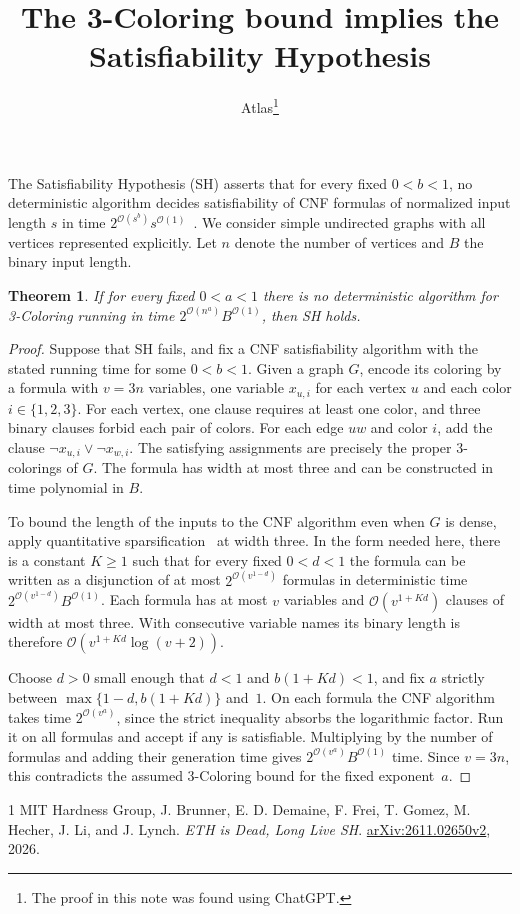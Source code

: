 \documentclass[11pt]{article}
\title{The 3-Coloring bound implies the Satisfiability Hypothesis}
\author{Atlas\thanks{The proof in this note was found using ChatGPT.}}
\date{}
\newtheorem{theorem}{Theorem}
\begin{document}
\maketitle

The Satisfiability Hypothesis (SH) asserts that for every fixed \(0<b<1\),
no deterministic algorithm decides satisfiability of CNF formulas of normalized
input length \(s\) in time \(2^{\mathcal O(s^b)}s^{\mathcal O(1)}\)~\cite{sh}.
We consider simple undirected graphs with all vertices represented explicitly.
Let \(n\) denote the number of vertices and \(B\) the binary input length.

\hypertarget{color-sh-converse}{}\begin{theorem}\label{color-sh-converse}
If for every fixed \(0<a<1\) there is no deterministic algorithm for
3-Coloring running in time \(2^{\mathcal O(n^a)}B^{\mathcal O(1)}\),
then SH holds.
\end{theorem}

\begin{proof}
Suppose that SH fails, and fix a CNF satisfiability algorithm with the
stated running time for some \(0<b<1\). Given a graph \(G\), encode its
coloring by a formula with \(v=3n\) variables, one variable \(x_{u,i}\) for
each vertex \(u\) and each color \(i\in\{1,2,3\}\). For each vertex,
one clause requires at least one color, and three binary clauses forbid
each pair of colors. For each edge \(uw\) and color \(i\), add the clause
\(\neg x_{u,i}\lor\neg x_{w,i}\). The satisfying assignments are precisely
the proper 3-colorings of \(G\). The formula has width at most three and
can be constructed in time polynomial in \(B\).

To bound the length of the inputs to the CNF algorithm even when \(G\) is
dense, apply quantitative sparsification~\cite[Lemma~2.2]{sh} at width
three. In the form needed here, there is a constant \(K\ge1\) such that
for every fixed \(0<d<1\) the formula can be written as a disjunction
of at most \(2^{\mathcal O(v^{1-d})}\) formulas in deterministic time
\(2^{\mathcal O(v^{1-d})}B^{\mathcal O(1)}\). Each formula has at most
\(v\) variables and \(\mathcal O(v^{1+Kd})\) clauses of width at most
three. With consecutive variable names its binary length is therefore
\(\mathcal O(v^{1+Kd}\log(v+2))\).

Choose \(d>0\) small enough that \(d<1\) and \(b(1+Kd)<1\), and fix
\(a\) strictly between \(\max\{1-d,b(1+Kd)\}\) and~\(1\).
On each formula the CNF algorithm takes time \(2^{\mathcal O(v^a)}\),
since the strict inequality absorbs the logarithmic factor.
Run it on all formulas and accept if any is satisfiable. Multiplying
by the number of formulas and adding their generation time gives
\(2^{\mathcal O(v^a)}B^{\mathcal O(1)}\) time. Since \(v=3n\), this
contradicts the assumed 3-Coloring bound for the fixed exponent~\(a\).
\end{proof}

\begin{thebibliography}{1}
 MIT Hardness Group, J. Brunner, E. D. Demaine, F. Frei,
T. Gomez, M. Hecher, J. Li, and J. Lynch.
\emph{ETH is Dead, Long Live SH}.
\href{https://arxiv.org/abs/2611.02650v2}{arXiv:2611.02650v2}, 2026.
\end{thebibliography}
\end{document}
